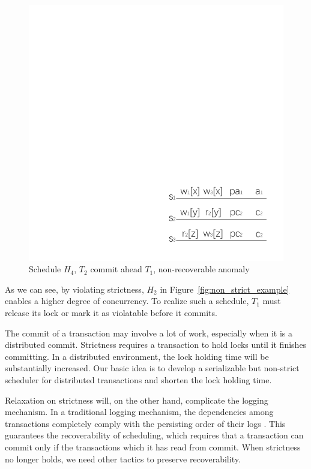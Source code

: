 \documentclass[conference]{IEEEtran}
\begin{document}
\begin{figure}[htbp]
  \centerline{\includegraphics[scale=1]{figure/schedule_not_recoverable.pdf}}
  \caption{Schedule ${H_4}$, ${T_2}$ commit ahead ${T_1}$, non-recoverable anomaly}
  \label{fig:schedule_not_recoverable}
\end{figure}


As we can see, by violating strictness, ${H_2}$ in Figure~\ref{fig:non_strict_example} enables a higher degree of concurrency.
To realize such a schedule, ${T_1}$ must release its lock or mark it as violatable before it commits.

The commit of a transaction may involve a lot of work, especially when it is a distributed commit.
Strictness requires a transaction to hold locks until it finishes committing. In a distributed environment, the lock holding time will be substantially increased.
Our basic idea is to develop a serializable but non-strict scheduler for distributed transactions and shorten the lock holding time.

Relaxation on strictness will, on the other hand, complicate the logging mechanism.
In a traditional logging mechanism, the dependencies among transactions completely comply with the persisting order of their logs \cite{ELR:dewitt_implementation_1984}\cite{EfficientLocking:conf/vldb/KimuraGK12}.
This guarantees the recoverability of scheduling, which requires that a transaction can commit only if the transactions which it has read from commit. 
When strictness no longer holds, we need other tactics to preserve recoverability.
\end{document}
